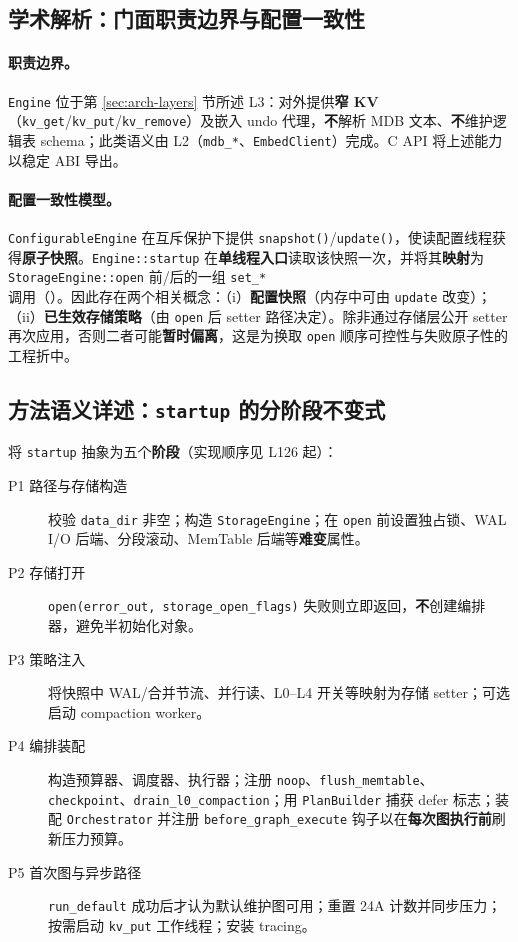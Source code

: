 \subsection{学术解析：门面职责边界与配置一致性}

\paragraph{职责边界。}
\texttt{Engine} 位于第 \ref{sec:arch-layers} 节所述 L3：对外提供\textbf{窄 KV}（\texttt{kv\_get}/\texttt{kv\_put}/\texttt{kv\_remove}）及嵌入 undo 代理，\textbf{不}解析 MDB 文本、\textbf{不}维护逻辑表 schema；此类语义由 L2（\texttt{mdb\_*}、\texttt{EmbedClient}）完成。C API 将上述能力以稳定 ABI 导出。

\paragraph{配置一致性模型。}
\texttt{ConfigurableEngine} 在互斥保护下提供 \texttt{snapshot()}/\texttt{update()}，使读配置线程获得\textbf{原子快照}。\texttt{Engine::startup} 在\textbf{单线程入口}读取该快照一次，并将其\textbf{映射}为 \texttt{StorageEngine::open} 前/后的一组 \texttt{set\_*} 调用（）。因此存在两个相关概念：（i）\textbf{配置快照}（内存中可由 \texttt{update} 改变）；（ii）\textbf{已生效存储策略}（由 \texttt{open} 后 setter 路径决定）。除非通过存储层公开 setter 再次应用，否则二者可能\textbf{暂时偏离}，这是为换取 \texttt{open} 顺序可控性与失败原子性的工程折中。

\subsection{方法语义详述：\texttt{startup} 的分阶段不变式}

将 \texttt{startup} 抽象为五个\textbf{阶段}（实现顺序见  L126 起）：
\begin{description}
  \item[P1 路径与存储构造] 校验 \texttt{data\_dir} 非空；构造 \texttt{StorageEngine}；在 \texttt{open} 前设置独占锁、WAL I/O 后端、分段滚动、MemTable 后端等\textbf{难变}属性。
  \item[P2 存储打开] \texttt{open(error\_out, storage\_open\_flags)} 失败则立即返回，\textbf{不}创建编排器，避免半初始化对象。
  \item[P3 策略注入] 将快照中 WAL/合并节流、并行读、L0--L4 开关等映射为存储 setter；可选启动 compaction worker。
  \item[P4 编排装配] 构造预算器、调度器、执行器；注册 \texttt{noop}、\texttt{flush\_memtable}、\texttt{checkpoint}、\texttt{drain\_l0\_compaction}；用 \texttt{PlanBuilder} 捕获 defer 标志；装配 \texttt{Orchestrator} 并注册 \texttt{before\_graph\_execute} 钩子以在\textbf{每次图执行前}刷新压力预算。
  \item[P5 首次图与异步路径] \texttt{run\_default} 成功后才认为默认维护图可用；重置 24A 计数并同步压力；按需启动 \texttt{kv\_put} 工作线程；安装 tracing。
\end{description}

